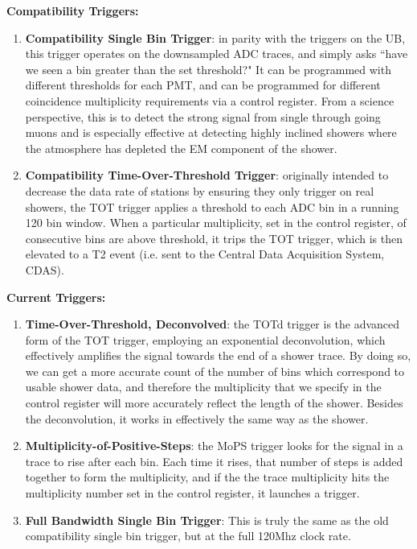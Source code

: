 \noindent\textbf{Compatibility Triggers:}
\begin{enumerate}
\item \textbf{Compatibility Single Bin Trigger}: in parity with the triggers on the UB, this trigger operates on the downsampled ADC traces, and simply asks ``have we seen a bin greater than the set threshold?" It can be programmed with different thresholds for each PMT, and can be programmed for different coincidence multiplicity requirements via a control register. From a science perspective, this is to detect the strong signal from single through going muons and is especially effective at detecting highly inclined showers where the atmosphere has depleted the EM component of the shower.

\item \textbf{Compatibility Time-Over-Threshold Trigger}: originally intended to decrease the data rate of stations by ensuring they only trigger on real showers, the TOT trigger applies a threshold to each ADC bin in a running 120 bin window. When a particular multiplicity, set in the control register, of consecutive bins are above threshold, it trips the TOT trigger, which is then elevated to a T2 event (i.e. sent to the Central Data Acquisition System, CDAS). 
\end{enumerate}

\noindent\noindent\textbf{Current Triggers:}
\begin{enumerate}
\item \textbf{Time-Over-Threshold, Deconvolved}: the TOTd trigger is the advanced form of the TOT trigger, employing an exponential deconvolution, which effectively amplifies the signal towards the end of a shower trace. By doing so, we can get a more accurate count of the number of bins which correspond to usable shower data, and therefore the multiplicity that we specify in the control register will more accurately reflect the length of the shower.  Besides the deconvolution, it works in effectively the same way as the shower.
\item \textbf{Multiplicity-of-Positive-Steps}: the MoPS trigger looks for the signal in a trace to rise after each bin. Each time it rises, that number of steps is added together to form the multiplicity, and if the the trace multiplicity hits the multiplicity number set in the control register, it launches a trigger. 
\item \textbf{Full Bandwidth Single Bin Trigger}: This is truly the same as the old compatibility single bin trigger, but at the full 120Mhz clock rate.
\end{enumerate}

